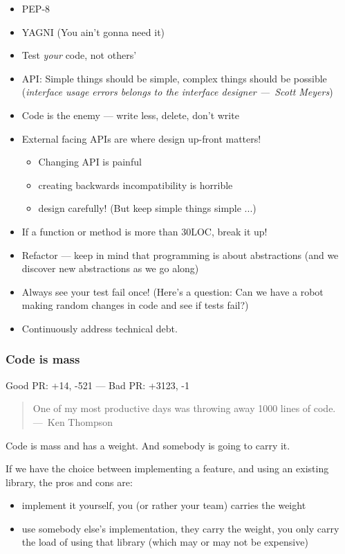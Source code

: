 \documentclass{beamer}
\newcommand{\bigpause}{\bigskip\pause}
\begin{document}
\begin{frame}
  \begin{itemize}
  \item PEP-8 \pause
  \item YAGNI (You ain't gonna need it) \pause
  \item Test \emph{your} code, not others' \pause
  \item API: Simple things should be simple, complex things should be possible (\emph{interface usage errors belongs to the   interface designer ---~Scott Meyers})\pause
  \item Code is the enemy --- write less, delete, don't write \pause
  \item External facing APIs are where design up-front matters!
    \begin{itemize}
    \item Changing API is painful
    \item creating backwards incompatibility is horrible
    \item design carefully! (But keep simple things simple ...)
    \end{itemize} \pause
  \item If a function or method is more than 30LOC, break it up! \pause
  \item Refactor --- keep in mind that programming is about abstractions (and we
    discover new abstractions as we go along) \pause
  \item Always see your test fail once!  (Here's a question: Can we have a robot
    making random changes in code and see if tests fail?) \pause
  \item Continuously address technical debt.
  \end{itemize}
\end{frame}

\begin{frame}
  \frametitle{Code is mass}

  Good PR: +14, -521 --- Bad PR: +3123, -1

  \begin{quote}
    One of my most productive days was throwing away 1000 lines of code.
    ---~Ken Thompson
  \end{quote}

  Code is mass and has a weight.  And somebody is going to carry it.

  \bigpause

  If we have the choice between implementing a feature, and using an existing
  library, the pros and cons are:

  \begin{itemize}
  \item implement it yourself, you (or rather your team) carries the weight
  \item use somebody else's implementation, they carry the weight, you only
    carry the load of using that library (which may or may not be expensive)
  \end{itemize}
\end{frame}
\end{document}
